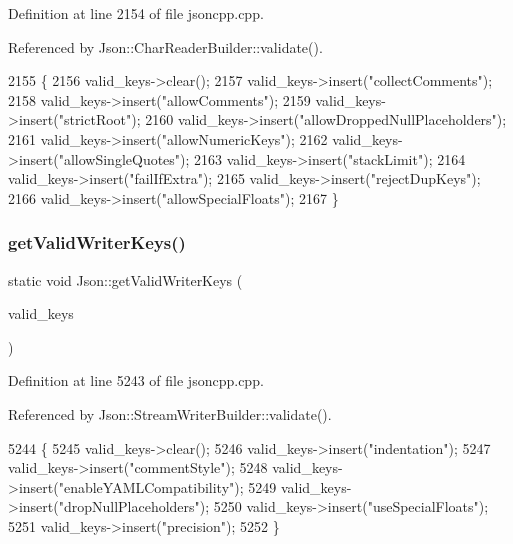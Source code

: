 Definition at line 2154 of file jsoncpp.\+cpp.



Referenced by Json\+::\+Char\+Reader\+Builder\+::validate().


\begin{DoxyCode}
2155 \{
2156   valid\_keys->clear();
2157   valid\_keys->insert(\textcolor{stringliteral}{"collectComments"});
2158   valid\_keys->insert(\textcolor{stringliteral}{"allowComments"});
2159   valid\_keys->insert(\textcolor{stringliteral}{"strictRoot"});
2160   valid\_keys->insert(\textcolor{stringliteral}{"allowDroppedNullPlaceholders"});
2161   valid\_keys->insert(\textcolor{stringliteral}{"allowNumericKeys"});
2162   valid\_keys->insert(\textcolor{stringliteral}{"allowSingleQuotes"});
2163   valid\_keys->insert(\textcolor{stringliteral}{"stackLimit"});
2164   valid\_keys->insert(\textcolor{stringliteral}{"failIfExtra"});
2165   valid\_keys->insert(\textcolor{stringliteral}{"rejectDupKeys"});
2166   valid\_keys->insert(\textcolor{stringliteral}{"allowSpecialFloats"});
2167 \}
\end{DoxyCode}
\mbox{\label{namespace_json_a77ffcc6bb405332d84c260d304d4384e}} 
\subsubsection{\texorpdfstring{get\+Valid\+Writer\+Keys()}{getValidWriterKeys()}}
{\footnotesize\ttfamily static void Json\+::get\+Valid\+Writer\+Keys (\begin{DoxyParamCaption}\item[{std\+::set$<$ \hyperlink{json_8h_a1e723f95759de062585bc4a8fd3fa4be}{J\+S\+O\+N\+C\+P\+P\+\_\+\+S\+T\+R\+I\+NG} $>$ $\ast$}]{valid\+\_\+keys }\end{DoxyParamCaption})\hspace{0.3cm}{\ttfamily [static]}}



Definition at line 5243 of file jsoncpp.\+cpp.



Referenced by Json\+::\+Stream\+Writer\+Builder\+::validate().


\begin{DoxyCode}
5244 \{
5245   valid\_keys->clear();
5246   valid\_keys->insert(\textcolor{stringliteral}{"indentation"});
5247   valid\_keys->insert(\textcolor{stringliteral}{"commentStyle"});
5248   valid\_keys->insert(\textcolor{stringliteral}{"enableYAMLCompatibility"});
5249   valid\_keys->insert(\textcolor{stringliteral}{"dropNullPlaceholders"});
5250   valid\_keys->insert(\textcolor{stringliteral}{"useSpecialFloats"});
5251   valid\_keys->insert(\textcolor{stringliteral}{"precision"});
5252 \}
\end{DoxyCode}
\mbox{\label{namespace_json_aff0180507262a244de61b961178d7443}} 
